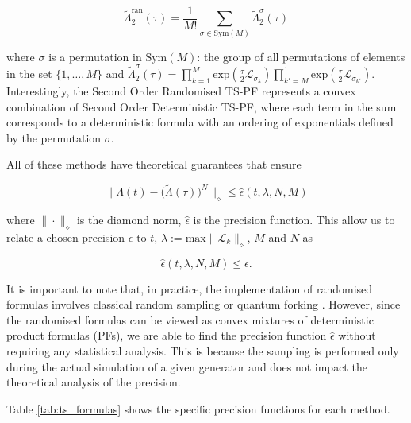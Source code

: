 \documentclass[pdflatex,sn-mathphys-num]{sn-jnl}%
\begin{document}
\begin{equation}
\tilde{\Lambda}_2^{\mathrm{ran}}(\tau) = \frac{1}{M!} \sum_{\sigma \in \mathrm{Sym}(M)} \tilde{\Lambda}_2^{\sigma}(\tau)
\end{equation}

\noindent where $\sigma$ is a permutation in $\mathrm{Sym}(M)$: the group of all permutations of elements in the set $\{1,\dots,M\}$ and $\tilde{\Lambda}_2^{\sigma}(\tau) = \prod_{k=1}^M \mathrm{exp}(\frac{\tau}{2}\mathcal{L}_{\sigma_k}) \prod_{k'=M}^1 \mathrm{exp}(\frac{\tau}{2}\mathcal{L}_{\sigma_{k'}})$. Interestingly, the Second Order Randomised TS-PF represents a convex combination of Second Order Deterministic TS-PF, where each term in the sum corresponds to a deterministic formula with an ordering of exponentials defined by the permutation $\sigma$. 

All of these methods have theoretical guarantees that ensure 

\begin{equation}
    \| \Lambda(t)-\big(\tilde{\Lambda}(\tau)\big)^N\|_\diamond \le \hat\epsilon(t,\lambda,N,M) 
\end{equation}

\noindent where $\|\cdot\|_\diamond$ is the diamond norm, $\hat\epsilon$ is the precision function. This allow us to relate a chosen precision $\epsilon$ to $t$, $\lambda := \mathrm{max} \|\mathcal{L}_k\|_\diamond$, $M$ and $N$ as 

\begin{equation}
    \hat\epsilon(t,\lambda,N,M) \le \epsilon.
\label{epsilon_func_and_epsilon}
\end{equation}

It is important to note that, in practice, the implementation of randomised formulas involves classical random sampling or quantum forking \cite{david2024faster}. However, since the randomised formulas can be viewed as convex mixtures of deterministic product formulas (PFs), we are able to find the precision function $\hat\epsilon$ without requiring any statistical analysis. This is because the sampling is performed only during the actual simulation of a given generator and does not impact the theoretical analysis of the precision.

\noindent Table \ref{tab:ts_formulas} shows the specific precision functions for each method.
\end{document}
